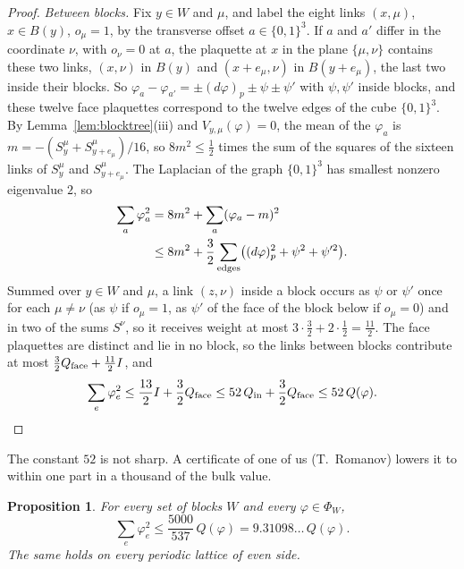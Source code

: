 \documentclass[11pt]{amsart}
\newtheorem{proposition}[theorem]{Proposition}
\theoremstyle{definition}
\theoremstyle{remark}
\numberwithin{equation}{section}
\begin{document}
\begin{proof}
\emph{Between blocks.} Fix $y\in W$ and $\mu$, and label the eight links
$(x,\mu)$, $x\in B(y)$, $o_\mu=1$, by the transverse offset $a\in\{0,1\}^3$.
If $a$ and $a'$ differ in the coordinate $\nu$, with $o_\nu=0$ at $a$, the
plaquette at $x$ in the plane $\{\mu,\nu\}$ contains these two links,
$(x,\nu)$ in $B(y)$ and $(x+e_\mu,\nu)$ in $B(y+e_\mu)$, the last two inside
their blocks. So $\varphi_a-\varphi_{a'}=\pm(d\varphi)_p\pm\psi\pm\psi'$ with
$\psi,\psi'$ inside blocks, and these twelve face plaquettes correspond to the
twelve edges of the cube $\{0,1\}^3$. By Lemma~\ref{lem:blocktree}(iii) and
$V_{y,\mu}(\varphi)=0$, the mean of the $\varphi_a$ is $m=-(S^\mu_y+
S^\mu_{y+e_\mu})/16$, so $8m^2\le\frac12$ times the sum of the squares of the
sixteen links of $S^\mu_y$ and $S^\mu_{y+e_\mu}$. The Laplacian of the graph
$\{0,1\}^3$ has smallest nonzero eigenvalue $2$, so
\[
\begin{split}
\sum_a\varphi_a^2&=8m^2+\sum_a(\varphi_a-m)^2\\
&\le8m^2+\frac32\sum_{\rm edges}\bigl((d\varphi)_p^2+\psi^2+\psi'^2\bigr).
\end{split}
\]
Summed over $y\in W$ and $\mu$, a link $(z,\nu)$ inside a block occurs as
$\psi$ or $\psi'$ once for each $\mu\ne\nu$ (as $\psi$ if $o_\mu=1$, as
$\psi'$ of the face of the block below if $o_\mu=0$) and in two of the sums
$S^\nu$, so it receives weight at most $3\cdot\frac32+2\cdot\frac12=
\frac{11}2$. The face plaquettes are distinct and lie in no block, so the
links between blocks contribute at most $\frac32Q_{\rm face}+\frac{11}2I$,
and
\[
\sum_e\varphi_e^2\le\frac{13}2I+\frac32Q_{\rm face}\le52\,Q_{\rm in}+
\frac32Q_{\rm face}\le52\,Q(\varphi).\qedhere
\]
\end{proof}

The constant $52$ is not sharp. A certificate of one of us (T.~Romanov)
lowers it to within one part in a thousand of the bulk value.

\begin{proposition}\label{prop:blockgapsharp}
For every set of blocks $W$ and every $\varphi\in\Phi_W$,
\[
\sum_e\varphi_e^2\le\frac{5000}{537}\,Q(\varphi)=9.31098\ldots\,Q(\varphi).
\]
The same holds on every periodic lattice of even side.
\end{proposition}
\end{document}
